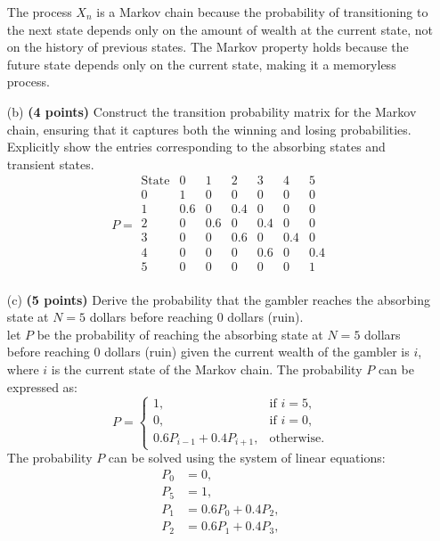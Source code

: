\documentclass{article}
\begin{document}
\begin{itemize}
    The process \( X_n \) is a Markov chain because the probability of transitioning to the next state depends only on the amount of wealth at the current state, not on the history of previous states. The Markov property holds because the future state depends only on the current state, making it a memoryless process.
    
    \item[(b)] \textbf{(4 points)} Construct the transition probability matrix for the Markov chain, ensuring that it captures both the winning and losing probabilities. Explicitly show the entries corresponding to the absorbing states and transient states.
\[
P =
\begin{array}{c|cccccc}
\text{State} & 0   & 1   & 2   & 3   & 4   & 5   \\
\hline
0 & 1   & 0   & 0   & 0   & 0   & 0   \\
1 & 0.6 & 0   & 0.4 & 0   & 0   & 0   \\
2 & 0   & 0.6 & 0   & 0.4 & 0   & 0   \\
3 & 0   & 0   & 0.6 & 0   & 0.4 & 0   \\
4 & 0   & 0   & 0   & 0.6 & 0   & 0.4 \\
5 & 0   & 0   & 0   & 0   & 0   & 1   \\
\end{array}
\]    
\item[(c)] \textbf{(5 points)} Derive the probability that the gambler reaches the absorbing state at \( N = 5 \) dollars before reaching 0 dollars (ruin).
    \\ let \( P \) be the probability of reaching the absorbing state at \( N = 5 \) dollars before reaching 0 dollars (ruin) given the current wealth of the gambler is \( i \), where \( i \) is the current state of the Markov chain. The probability \( P \) can be expressed as:
    \[
    P = \begin{cases}
    1, & \text{if } i = 5, \\
    0, & \text{if } i = 0, \\
    0.6P_{i-1} + 0.4P_{i+1}, & \text{otherwise}.
    \end{cases}
    \]
    The probability \( P \) can be solved using the system of linear equations:
    \[
    \begin{aligned}
    P_0 & = 0, \\
    P_5 & = 1, \\
    P_1 & = 0.6P_0 + 0.4P_2, \\
    P_2 & = 0.6P_1 + 0.4P_3, \\

\end{aligned}\]
\end{itemize}
\end{document}
